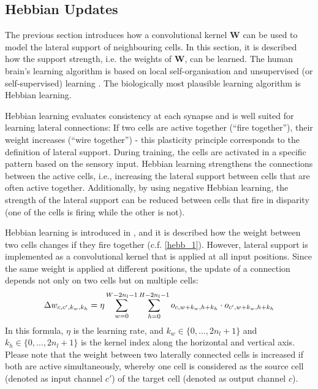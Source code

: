 \subsection{Hebbian Updates}
The previous section introduces how a convolutional kernel $\boldsymbol{W}$ can be used to model the lateral support of neighbouring cells.
In this section, it is described how the support strength, i.e. the weights of $\boldsymbol{W}$, can be learned.
The human brain's learning algorithm is based on local self-organisation and unsupervised (or self-supervised) learning . The biologically most plausible learning algorithm is Hebbian learning.

Hebbian learning evaluates consistency at each synapse and is well suited for learning lateral connections: If two cells are active together (``fire together''), their weight increases (``wire together'') - this plasticity principle corresponds to the definition of lateral support. During training, the cells are activated in a specific pattern based on the sensory input. Hebbian learning strengthens the connections between the active cells, i.e., increasing the lateral support between cells that are often active together. Additionally, by using negative Hebbian learning, the strength of the lateral support can be reduced between cells that fire in disparity (one of the cells is firing while the other is not).

Hebbian learning is introduced in , and it is described how the weight between two cells changes if they fire together (c.f. \eqref{hebb_1}).
However, lateral support is implemented as a convolutional kernel that is applied at all input positions.
Since the same weight is applied at different positions, the update of a connection depends not only on two cells but on multiple cells:
%
\begin{align}\eqlbl{hebbu_1}
	\Delta w_{c, c',k_w,k_h} = \eta \sum_{w = 0}^{W - 2n_l - 1} \sum_{h = 0}^{H - 2n_l - 1} o_{c,w+k_w,h+k_h} \cdot o_{c',w+k_w,h+k_h}
\end{align}
%
In this formula, $\eta$ is the learning rate, and $k_w \in \{0, ..., 2n_l+1\}$ and $k_h\in \{0, ..., 2n_l+1 \}$ is the kernel index along the horizontal and vertical axis.
Please note that the weight between two laterally connected cells is increased if both are active simultaneously, whereby one cell is considered as the source cell (denoted as input channel $c'$) of the target cell (denoted as output channel $c$).


